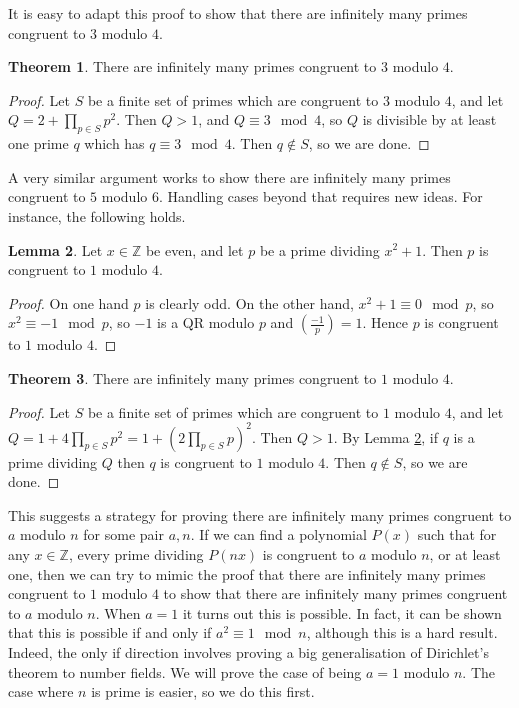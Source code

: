 \documentclass{article}
\newcommand{\Z}{\mathbb{Z}}
\newcommand{\rb}[1]{\left( #1 \right)}
\newcommand{\legendre}[2]{\rb{\tfrac{#1}{#2}}}
\theoremstyle{definition}\newtheorem{definition}{Definition}
\theoremstyle{definition}\newtheorem{remark}[definition]{Remark}
\theoremstyle{definition}\newtheorem*{example}{Example}
\theoremstyle{definition}\newtheorem*{note}{Note}
\newtheorem{lemma}[definition]{Lemma}
\newtheorem{theorem}[definition]{Theorem}
\begin{document}
It is easy to adapt this proof to show that there are infinitely many primes congruent to $ 3 $ modulo $ 4 $.

\begin{theorem}
There are infinitely many primes congruent to $ 3 $ modulo $ 4 $.
\end{theorem}

\begin{proof}
Let $ S $ be a finite set of primes which are congruent to $ 3 $ modulo $ 4 $, and let $ Q = 2 + \prod_{p \in S} p^2 $. Then $ Q > 1 $, and $ Q \equiv 3 \mod 4 $, so $ Q $ is divisible by at least one prime $ q $ which has $ q \equiv 3 \mod 4 $. Then $ q \notin S $, so we are done.
\end{proof}

A very similar argument works to show there are infinitely many primes congruent to $ 5 $ modulo $ 6 $. Handling cases beyond that requires new ideas. For instance, the following holds.

\begin{lemma}
\label{lem:87}
Let $ x \in \Z $ be even, and let $ p $ be a prime dividing $ x^2 + 1 $. Then $ p $ is congruent to $ 1 $ modulo $ 4 $.
\end{lemma}

\begin{proof}
On one hand $ p $ is clearly odd. On the other hand, $ x^2 + 1 \equiv 0 \mod p $, so $ x^2 \equiv -1 \mod p $, so $ -1 $ is a QR modulo $ p $ and $ \legendre{-1}{p} = 1 $. Hence $ p $ is congruent to $ 1 $ modulo $ 4 $.
\end{proof}

\begin{theorem}
There are infinitely many primes congruent to $ 1 $ modulo $ 4 $.
\end{theorem}

\begin{proof}
Let $ S $ be a finite set of primes which are congruent to $ 1 $ modulo $ 4 $, and let $ Q = 1 + 4\prod_{p \in S} p^2 = 1 + \rb{2\prod_{p \in S} p}^2 $. Then $ Q > 1 $. By Lemma \ref{lem:87}, if $ q $ is a prime dividing $ Q $ then $ q $ is congruent to $ 1 $ modulo $ 4 $. Then $ q \notin S $, so we are done.
\end{proof}

This suggests a strategy for proving there are infinitely many primes congruent to $ a $ modulo $ n $ for some pair $ a, n $. If we can find a polynomial $ P\rb{x} $ such that for any $ x \in \Z $, every prime dividing $ P\rb{nx} $ is congruent to $ a $ modulo $ n $, or at least one, then we can try to mimic the proof that there are infinitely many primes congruent to $ 1 $ modulo $ 4 $ to show that there are infinitely many primes congruent to $ a $ modulo $ n $. When $ a = 1 $ it turns out this is possible. In fact, it can be shown that this is possible if and only if $ a^2 \equiv 1 \mod n $, although this is a hard result. Indeed, the only if direction involves proving a big generalisation of Dirichlet's theorem to number fields. We will prove the case of being $ a = 1 $ modulo $ n $. The case where $ n $ is prime is easier, so we do this first.
\end{document}
